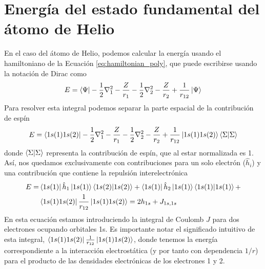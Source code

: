 \documentclass{tufte-handout}
\begin{document}
\section{Energía del estado fundamental del átomo de Helio}
En el caso del átomo de Helio, podemos calcular la
energía usando el hamiltoniano de la
Ecuación \ref{eq:hamiltonian_poly}, que puede escribirse
usando la notación de Dirac como 
\begin{equation}
    E=\bra{\Psi}-\frac{1}{2}\nabla^2_1 -\frac{Z}{r_1}-\frac{1}{2}\nabla^2_2 -\frac{Z}{r_2}+\frac{1}{r_{12}}\ket{\Psi}
\end{equation}
Para resolver esta integral podemos separar la parte
espacial de la contribución de espín
\begin{equation}
    E=\bra{1s(1)1s(2)}-\frac{1}{2}\nabla^2_1 -\frac{Z}{r_1}-\frac{1}{2}\nabla^2_2 -\frac{Z}{r_2}+\frac{1}{r_{12}}\ket{1s(1)1s(2)}\braket{\Sigma}
\end{equation}
donde $\braket{\Sigma}$ representa la contribución de espín, que al estar normalizada es 1.
Así, nos quedamos exclusivamente con contribuciones 
para un solo electrón ($\hat{h}_i$) y una contribución 
que contiene la repulsión interelectrónica
\begin{align}
\begin{split}
    E=&\bra{1s(1)}\hat{h}_{1}\ket{1s(1)}\braket{1s(2)} +
    \bra{1s(1)}\hat{h}_2\ket{1s(1)}\braket{1s(1)} + \\
    & \bra{1s(1)1s(2)} \frac{1}{r_{12}} \ket{1s(1)1s(2)}=
    2h_{1s}+J_{1s,1s}
\end{split}
\end{align}
En esta ecuación estamos introduciendo la integral de 
Coulomb $J$ para dos electrones ocupando orbitales 1s.
Es importante notar el significado intuitivo de esta 
integral, $\bra{1s(1)1s(2)} \frac{1}{r_{12}} \ket{1s(1)1s(2)}$, donde tenemos la energía correspondiente a la interacción electrostática (y por tanto con dependencia $1/r$) 
para el producto de las densidades electrónicas de los
electrones 1 y 2. 
\end{document}
